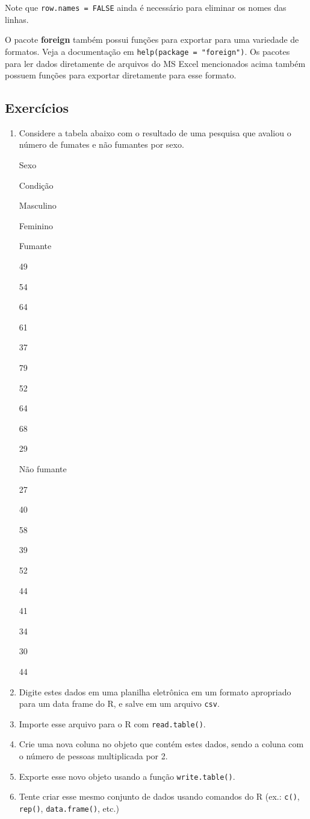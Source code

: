\documentclass[10pt,a4paper]{book}
\providecommand{\tightlist}{%
  \setlength{\itemsep}{0pt}\setlength{\parskip}{0pt}}
\begin{document}
Note que \texttt{row.names\ =\ FALSE} ainda é necessário para eliminar
os nomes das linhas.

O pacote \textbf{foreign} também possui funções para exportar para uma
variedade de formatos. Veja a documentação em
\texttt{help(package\ =\ "foreign")}. Os pacotes para ler dados
diretamente de arquivos do MS Excel mencionados acima também possuem
funções para exportar diretamente para esse formato.

\subsection*{Exercícios}\label{exercuxedcios-11}


\begin{enumerate}
\def\labelenumi{\arabic{enumi}.}
\tightlist
\item
  Considere a tabela abaixo com o resultado de uma pesquisa que avaliou
  o número de fumates e não fumantes por sexo.

  Sexo

  Condição

  Masculino

  Feminino

  Fumante

  49

  54

  64

  61

  37

  79

  52

  64

  68

  29

  Não fumante

  27

  40

  58

  39

  52

  44

  41

  34

  30

  44
\item
  Digite estes dados em uma planilha eletrônica em um formato apropriado
  para um data frame do R, e salve em um arquivo \texttt{csv}.
\item
  Importe esse arquivo para o R com \texttt{read.table()}.
\item
  Crie uma nova coluna no objeto que contém estes dados, sendo a coluna
  com o número de pessoas multiplicada por 2.
\item
  Exporte esse novo objeto usando a função \texttt{write.table()}.
\item
  Tente criar esse mesmo conjunto de dados usando comandos do R (ex.:
  \texttt{c()}, \texttt{rep()}, \texttt{data.frame()}, etc.)
\end{enumerate}
\end{document}
